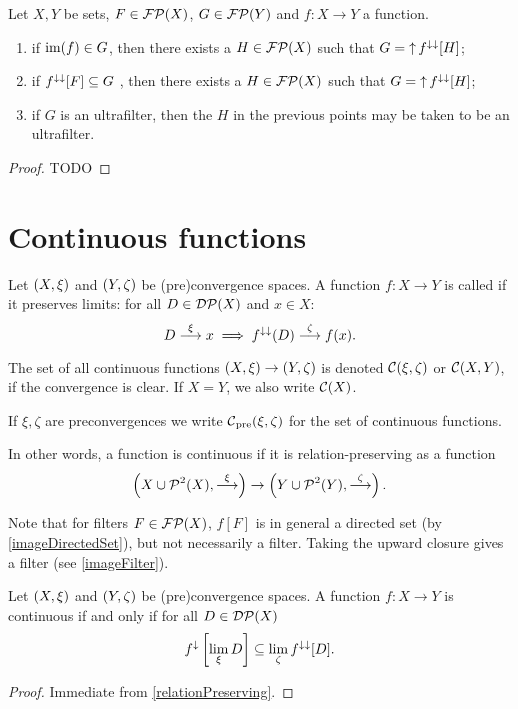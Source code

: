\begin{proposition} \label{preimageFilter}
Let $X,Y$ be sets, $F\in\operatorname{\mathcal{FP}}(X)$, $G\in\operatorname{\mathcal{FP}}(Y)$ and $f: X\to Y$ a function.
\begin{enumerate}
\item if $\operatorname{im}(f)\in G$, then there exists a $H\in\operatorname{\mathcal{FP}}(X)$ such that $G = \operatorname{\uparrow} f^{\downarrow\downarrow}[H]$;
\item if $f^{\downarrow\downarrow}[F]\subseteq G$ , then there exists a $H\in\operatorname{\mathcal{FP}}(X)$ such that $G = \operatorname{\uparrow} f^{\downarrow\downarrow}[H]$;
\item if $G$ is an ultrafilter, then the $H$ in the previous points may be taken to be an ultrafilter.
\end{enumerate}
\end{proposition}
\begin{proof}
TODO
\end{proof}

\section{Continuous functions}
\begin{definition}
Let $\left( X,\xi \right)$ and $\left( Y,\zeta \right)$ be (pre)convergence spaces. A function $f: X\to Y$ is called  if it preserves limits: for all $D \in \operatorname{\mathcal{DP}}(X)$ and $x\in X$:
\[ D \overset{\xi}{\longrightarrow} x \implies f^{\downarrow\downarrow}(D) \overset{\zeta}{\longrightarrow} f(x). \]

The set of all continuous functions $\left( X,\xi \right) \to \left( Y,\zeta \right)$ is denoted $\operatorname{\mathcal{C}}(\xi, \zeta)$ or $\operatorname{\mathcal{C}}(X,Y)$, if the convergence is clear. If $X=Y$, we also write $\operatorname{\mathcal{C}}(X)$.

If $\xi,\zeta$ are preconvergences we write $\operatorname{\mathcal{C}}_\text{pre}(\xi, \zeta)$ for the set of continuous functions.
\end{definition}
In other words, a function is continuous if it is relation-preserving as a function
\[ \left( X \cup \operatorname{\mathcal{P}}^2(X), \overset{\xi}{\longrightarrow} \right) \to \left( Y \cup \operatorname{\mathcal{P}}^2(Y), \overset{\zeta}{\longrightarrow} \right). \]

Note that for filters $F\in\operatorname{\mathcal{FP}}(X)$, $f[F]$ is in general a directed set (by \ref{imageDirectedSet}), but not necessarily a filter. Taking the upward closure gives a filter (see \ref{imageFilter}).

\begin{lemma}
Let $\left( X,\xi \right)$ and $\left( Y,\zeta \right)$ be (pre)convergence spaces. A function $f: X\to Y$ is continuous \textup{if and only if} for all $D \in \operatorname{\mathcal{DP}}(X)$
\[ f^{\downarrow}\left[\lim_\xi D \right] \subseteq \lim_\zeta f^{\downarrow\downarrow}[D]. \]
\end{lemma}
\begin{proof}
Immediate from \ref{relationPreserving}.
\end{proof}


